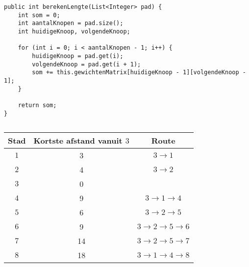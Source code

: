 \begin{Oplossing}{8.4}
\begin{lstlisting}[caption={berekenLengte}, label=FloydberekenLengte]
public int berekenLengte(List<Integer> pad) {
	int som = 0;
	int aantalKnopen = pad.size();
	int huidigeKnoop, volgendeKnoop;
		
	for (int i = 0; i < aantalKnopen - 1; i++) {
		huidigeKnoop = pad.get(i);
		volgendeKnoop = pad.get(i + 1);
		som += this.gewichtenMatrix[huidigeKnoop - 1][volgendeKnoop - 1];
	}
		
	return som;
}
\end{lstlisting}
\end{Oplossing}
\begin{Oplossing}{9.1}
$\quad$\\
$\quad$\\
\begin{tabular}{ccc}
\toprule
Stad & Kortste afstand vanuit $3$ & Route \\
\midrule
$1$ & 3 & $3\rightarrow 1$ \\
\midrule
$2$ & 4 & $3\rightarrow 2$ \\
\midrule
$3$ & 0 \\
\midrule
$4$ & 9&$3\rightarrow 1 \rightarrow 4$ \\
\midrule
$5$ & 6 & $3\rightarrow 2 \rightarrow 5$\\
\midrule
$6$ & 9 & $3\rightarrow 2 \rightarrow 5 \rightarrow 6$ \\
\midrule
$7$ & 14 & $3 \rightarrow 2 \rightarrow 5 \rightarrow 7$ \\
\midrule
$8$ & 18 & $3 \rightarrow 1 \rightarrow 4 \rightarrow 8$ \\
\bottomrule
\end{tabular}
\end{Oplossing}

